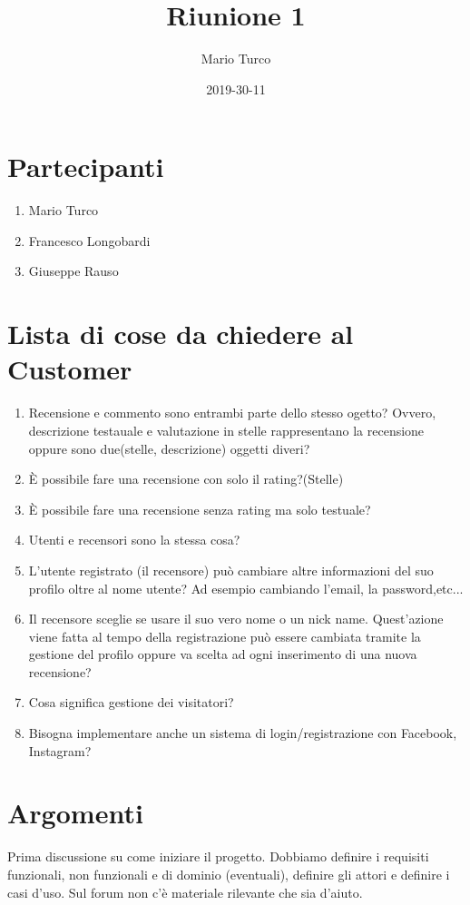 \documentclass{article}
\title{Riunione 1}
\date{2019-30-11}
\author{Mario Turco}
\begin{document}
\maketitle
{}
\newpage
{}
\section{Partecipanti}
\begin{enumerate}
    \item Mario Turco
    \item Francesco Longobardi  
    \item Giuseppe Rauso
\end{enumerate}
\section{Lista di cose da chiedere al Customer}
\begin{enumerate}
    \item Recensione e commento sono entrambi parte dello stesso ogetto? Ovvero, descrizione testauale e valutazione in stelle rappresentano la recensione oppure sono due(stelle, descrizione) oggetti diveri?
    \item È possibile fare una recensione con solo il rating?(Stelle)
    \item È possibile fare una recensione senza rating ma solo testuale?
    \item Utenti e recensori sono la stessa cosa?
    \item L'utente registrato (il recensore) può cambiare altre informazioni del suo profilo oltre al nome utente? Ad esempio cambiando l'email, la password,etc...
    \item Il recensore sceglie se usare il suo vero nome o un nick name. Quest'azione viene fatta al tempo della registrazione può essere cambiata tramite la gestione del profilo oppure va scelta ad ogni inserimento di una nuova recensione?
    \item Cosa significa gestione dei visitatori?
    \item Bisogna implementare anche un sistema di login/registrazione con Facebook, Instagram?
\end{enumerate}
\newpage
\section{Argomenti}
Prima discussione su come iniziare il progetto.
Dobbiamo definire i requisiti funzionali, non funzionali e di dominio (eventuali), definire gli attori e definire i casi d'uso.
Sul forum non c'è materiale rilevante che sia d'aiuto.
\end{document}

